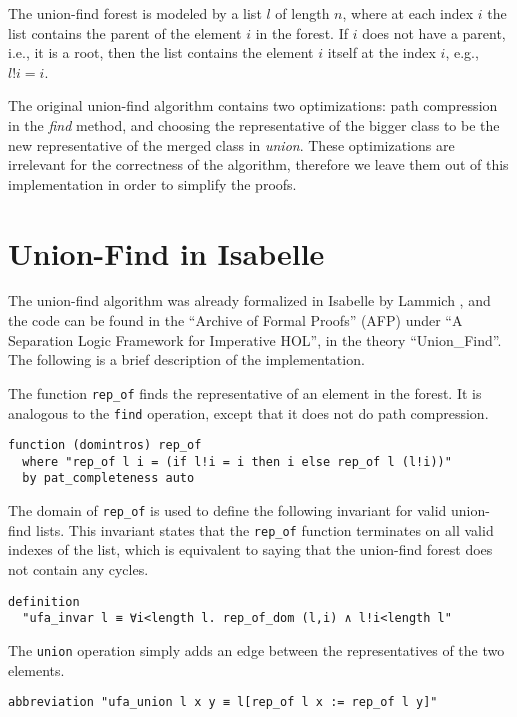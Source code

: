 The union-find forest is modeled by a list $l$ of length $n$, where at each index $i$ the list contains the parent of the element $i$ in the forest. If $i$ does not have a parent, i.e., it is a root, then the list contains the element $i$ itself at the index $i$, e.g., $l!i = i$.

The original union-find algorithm \cite{Tarjan} contains two optimizations: path compression in the \emph{find} method, and choosing the representative of the bigger class to be the new representative of the merged class in \emph{union}. These optimizations are irrelevant for the correctness of the algorithm, therefore we leave them out of this implementation in order to simplify the proofs.

\section{Union-Find in Isabelle}
\label{section:uf-isabelle}

The union-find algorithm was already formalized in Isabelle by Lammich \cite{unionfind-isabelle}, and the code can be found in the ``Archive of Formal Proofs'' (AFP) under ``A Separation Logic Framework for Imperative HOL'', in the theory ``Union\_Find''\cite{afp, Sep}. The following is a brief description of the implementation.

The function \lstinline{rep_of} finds the representative of an element in the forest. It is analogous to the \lstinline{find} operation, except that it does not do path compression.

\begin{lstlisting}
function (domintros) rep_of
  where "rep_of l i = (if l!i = i then i else rep_of l (l!i))"
  by pat_completeness auto
\end{lstlisting}

The domain of \lstinline{rep_of} is used to define the following invariant for valid union-find lists. This invariant states that the \lstinline{rep_of} function terminates on all valid indexes of the list, which is equivalent to saying that the union-find forest does not contain any cycles.

\begin{lstlisting}
definition
  "ufa_invar l ≡ ∀i<length l. rep_of_dom (l,i) ∧ l!i<length l"
\end{lstlisting}

The \lstinline{union} operation simply adds an edge between the representatives of the two elements.

\begin{lstlisting}
abbreviation "ufa_union l x y ≡ l[rep_of l x := rep_of l y]"
\end{lstlisting}

